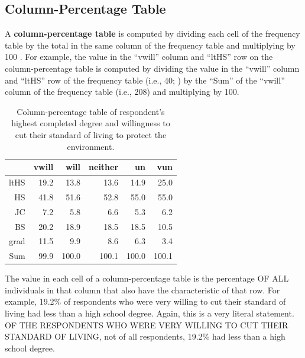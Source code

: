 \documentclass[10pt,openany]{book}\usepackage[]{graphicx}\usepackage[]{color}
\begin{document}
\vspace{-12pt}

\subsection{Column-Percentage Table}
\vspace{-12pt}
A \textbf{column-percentage table} is computed by dividing each cell of the frequency table by the total in the same column of the frequency table and multiplying by 100 .  For example, the value in the ``vwill'' column and ``ltHS'' row on the column-percentage table is computed by dividing the value in the ``vwill'' column and ``ltHS'' row of the frequency table (i.e., 40; ) by the ``Sum'' of the ``vwill'' column of the frequency table (i.e., 208) and multiplying by 100.

\begin{table}[ht]
\centering
\caption{Column-percentage table of respondent's highest completed degree and willingness to cut their standard of living to protect the environment.} 
\label{tab:EnvColP}
\begin{tabular}{rrrrrr}
  \hline
 & vwill & will & neither & un & vun \\ 
  \hline
ltHS & 19.2 & 13.8 & 13.6 & 14.9 & 25.0 \\ 
  HS & 41.8 & 51.6 & 52.8 & 55.0 & 55.0 \\ 
  JC & 7.2 & 5.8 & 6.6 & 5.3 & 6.2 \\ 
  BS & 20.2 & 18.9 & 18.5 & 18.5 & 10.5 \\ 
  grad & 11.5 & 9.9 & 8.6 & 6.3 & 3.4 \\ 
  Sum & 99.9 & 100.0 & 100.1 & 100.0 & 100.1 \\ 
   \hline
\end{tabular}
\end{table}


The value in each cell of a column-percentage table is the percentage OF ALL individuals in that column that also have the characteristic of that row.  For example, 19.2\% of respondents who were very willing to cut their standard of living had less than a high school degree.  Again, this is a very literal statement.  OF THE RESPONDENTS WHO WERE VERY WILLING TO CUT THEIR STANDARD OF LIVING, not of all respondents, 19.2\% had less than a high school degree.
\end{document}

